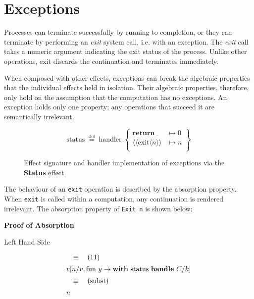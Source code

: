 \documentclass[logo,bsc,singlespacing,parskip]{infthesis}
\begin{document}
\section{Exceptions}
Processes can terminate successfully by running to completion, or they can terminate by performing an \textit{exit} system call, i.e. with an exception. The \textit{exit} call takes a numeric argument indicating the exit status of the process. Unlike other operations, exit discards the continuation and terminates immediately.

When composed with other effects, exceptions can break the algebraic properties that the individual effects held in isolation. Their algebraic properties, therefore, only hold on the assumption that the computation has no exceptions. An exception holds only one property; any operations that succeed it are semantically irrelevant.

\begin{figure}[H]
\centering


\vspace{-1em}

\[
\mathrm{status} \;\overset{\mathrm{def}}{=}\;
\mathrm{handler} \;\left\{
\begin{array}{ll}
  \mathrm{\textbf{return}\:\_} & \mapsto 0 \\[0.5ex]
  \langle\!\langle \mathrm{exit} \langle n\rangle\rangle & \mapsto n \\[0.5ex]
\end{array}
\right\}
\]

\caption{Effect signature and handler implementation of exceptions via the \textbf{Status} effect.}
\label{fig:status-handler}
\end{figure}


The behaviour of an \lstinline{exit} operation is described by the absorption property. When \lstinline{exit} is called within a computation, any continuation is rendered irrelevant. The absorption property of \lstinline{Exit n} is shown below:



{\large \textbf{Proof of Absorption}}

{Left Hand Side}

\[
\begin{array}{l}
\quad\equiv\quad (11) \\[5pt]
v [n/v, \text{fun } y \rightarrow \text{\textbf{with} status \textbf{handle} } C/k] \\[5pt]
\quad\equiv\quad (\text{subst}) \\[5pt]
n
\end{array}
\]
\end{document}
